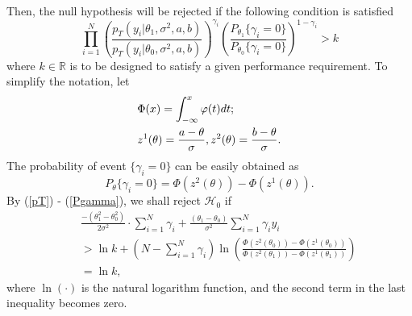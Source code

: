 \documentclass[journal]{IEEEtran}
\def\bR{\mathbb{R}}
\def\cH{\mathcal{H}}
\begin{document}
Then, the null hypothesis will be rejected if the following condition is satisfied
\begin{equation}
\label{rejectregion}
\prod_{i=1}^N \left(\frac{p_T(y_i|\theta_1,\sigma^2,a,b)}{p_T(y_i|\theta_0,\sigma^2,a,b)}\right)^{\gamma_i}\left(\frac{P_{\theta_1}\{\gamma_i=0\}}{P_{\theta_0}\{\gamma_i=0\}}\right)^{1-\gamma_i}> k
\end{equation}
where $k\in\bR$ is to be designed to satisfy a given performance requirement. To simplify the notation, let
\begin{equation*}
\begin{gathered}
\Phi(x)=\int_{-\infty}^{x}\varphi(t)dt;\hfill\\
z^1(\theta ) = \frac{{{a} - \theta }}{\sigma },
z^2(\theta ) = \frac{{{b} - \theta }}{\sigma }.\hfill\\
\end{gathered}
\end{equation*}
The probability of event $\{\gamma_{i}=0\}$ can be easily obtained as
\begin{equation}
\label{Pgamma}
{P}_{\theta}\{\gamma_{i}=0\}=\Phi(z^2(\theta ))-\Phi(z^1(\theta )).
\end{equation}
By (\ref{pT}) - (\ref{Pgamma}), we shall reject $\cH_{0}$ if
\begin{eqnarray}
\label{rejectlrb}
&&  \frac{{ - (\theta _1^2 - \theta _0^2)}}{{2{\sigma ^2}}} \cdot \sum\limits_{i = 1}^N {{\gamma_{i}}}  + \frac{{({\theta _1} - {\theta _0})}}{{{\sigma ^2}}}\sum\limits_{i = 1}^N {{\gamma_{i}y_i}}  \nonumber \\
&& >\ln k + (N - \sum\limits_{i = 1}^N {{\gamma _i}} )\ln\left( {\frac{{\Phi (z^2({\theta _0})) - \Phi (z^1({\theta _0}))}}{{\Phi (z^2({\theta _1})) - \Phi (z^1({\theta _1}))}}} \right)\nonumber\\
&&  =\ln k,
\end{eqnarray}
where $\ln(\cdot)$ is the natural logarithm function, and the second term in the last inequality becomes zero.
\end{document}
